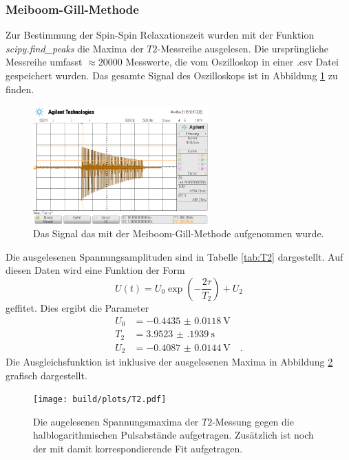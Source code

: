 \subsubsection{Meiboom-Gill-Methode}

\noindent
Zur Bestimmung der Spin-Spin Relaxationszeit wurden mit der Funktion \textit{scipy.find\_peaks} die Maxima der $T2$-Messreihe ausgelesen. 
Die ursprüngliche Messreihe umfasst $\approx 20000$ Messwerte, die vom Oszilloskop in einer .csv Datei gespeichert wurden. 
Das gesamte Signal des Oszilloskops ist in Abbildung \ref{img:Sig1} zu finden.
\begin{figure}[H]
  \centering
  \includegraphics[width=0.6\textwidth]{python/data/scope_2.png}
  \caption{Das Signal das mit der Meiboom-Gill-Methode aufgenommen wurde.}
\label{img:Sig1}
\end{figure}


\noindent
Die ausgelesenen Spannungsamplituden sind in Tabelle \ref{tab:T2} dargestellt. 
Auf diesen Daten wird eine Funktion der Form
\begin{equation*}
  U\left(t\right) = U_0 \exp{\left(-\frac{2\tau}{T_2}\right)} + U_2
\end{equation*}
geffitet. Dies ergibt die Parameter
\begin{align*}
  U_0 &= \SI{-0.4435(118)}{\volt}\\
  T_2 &= \SI{3.9523(1939)}{\second}\\
  U_2 &= \SI{-0.4087(144)}{\volt} \quad .
\end{align*}
Die Ausgleichsfunktion ist inklusive der ausgelesenen Maxima in Abbildung \ref{img:T2} grafisch dargestellt.


\begin{figure}[H]
  \centering
  \texttt{[image: build/plots/T2.pdf]}
  \caption{Die augelesenen Spannungsmaxima der $T2$-Messung gegen die halblogarithmischen Pulsabstände aufgetragen. 
  Zusätzlich ist noch der mit damit korrespondierende Fit aufgetragen.}
\label{img:T2}
\end{figure}


